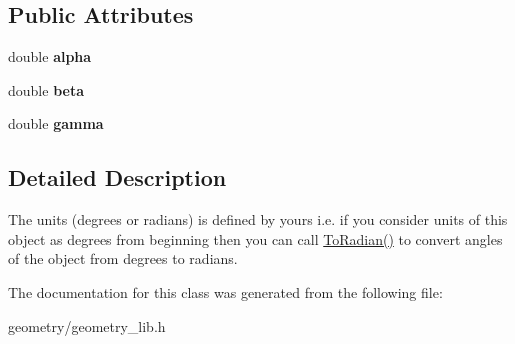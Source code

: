 \subsection*{Public Attributes}
\begin{DoxyCompactItemize}
\item 
\mbox{\label{class_angle3d_a425a491c1fba0187057262c027c1c895}} 
double {\bfseries alpha}
\item 
\mbox{\label{class_angle3d_a2da861200df2243445e8ea10770c30e6}} 
double {\bfseries beta}
\item 
\mbox{\label{class_angle3d_a336356293e0cb80365510f10c38396af}} 
double {\bfseries gamma}
\end{DoxyCompactItemize}


\subsection{Detailed Description}
The units (degrees or radians) is defined by yours i.\+e. if you consider units of this object as degrees from beginning then you can call \mbox{\hyperlink{class_angle3d_a9153e4b5be0fa9862d1f70401650aa67}{To\+Radian()}} to convert angles of the object from degrees to radians. 

The documentation for this class was generated from the following file\+:\begin{DoxyCompactItemize}
\item 
geometry/geometry\+\_\+lib.\+h\end{DoxyCompactItemize}
